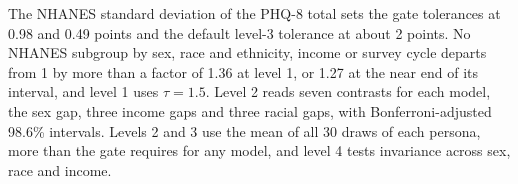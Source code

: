 The NHANES standard deviation of the PHQ-8 total sets the gate tolerances at 0.98 and 0.49 points and the default level-3 tolerance at about 2 points. %
No NHANES subgroup by sex, race and ethnicity, income or survey cycle departs from 1 by more than a factor of 1.36 at level 1, or 1.27 at the near end of its interval, and level 1 uses $\tau = 1.5$. %
Level 2 reads seven contrasts for each model, the sex gap, three income gaps and three racial gaps, with Bonferroni-adjusted 98.6\% intervals.
Levels 2 and 3 use the mean of all 30 draws of each persona, more than the gate requires for any model, and level 4 tests invariance across sex, race and income.
